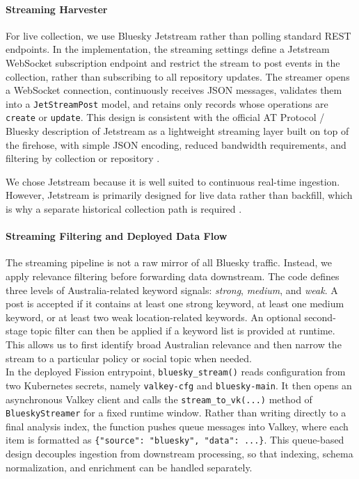 \paragraph{Streaming Harvester}
For live collection, we use Bluesky Jetstream rather than polling standard REST endpoints. In the implementation, the streaming settings define a Jetstream WebSocket subscription endpoint and restrict the stream to post events in the  collection, rather than subscribing to all repository updates. The streamer opens a WebSocket connection, continuously receives JSON messages, validates them into a \texttt{JetStreamPost} model, and retains only records whose operations are \texttt{create} or \texttt{update}. This design is consistent with the official AT Protocol / Bluesky description of Jetstream as a lightweight streaming layer built on top of the firehose, with simple JSON encoding, reduced bandwidth requirements, and filtering by collection or repository \cite{atproto2024jetstream,atproto2026streaming}.

We chose Jetstream because it is well suited to continuous real-time ingestion. However, Jetstream is primarily designed for live data rather than backfill, which is why a separate historical collection path is required \cite{atproto2024jetstream,atproto2026streaming}.

\paragraph{Streaming Filtering and Deployed Data Flow}
The streaming pipeline is not a raw mirror of all Bluesky traffic. Instead, we apply relevance filtering before forwarding data downstream. The code defines three levels of Australia-related keyword signals: \textit{strong}, \textit{medium}, and \textit{weak}. A post is accepted if it contains at least one strong keyword, at least one medium keyword, or at least two weak location-related keywords. An optional second-stage topic filter can then be applied if a keyword list is provided at runtime. This allows us to first identify broad Australian relevance and then narrow the stream to a particular policy or social topic when needed.
\\

In the deployed Fission entrypoint, \texttt{bluesky\_stream()} reads configuration from two Kubernetes secrets, namely \texttt{valkey-cfg} and \texttt{bluesky-main}. It then opens an asynchronous Valkey client and calls the \texttt{stream\_to\_vk(...)} method of \texttt{BlueskyStreamer} for a fixed runtime window. Rather than writing directly to a final analysis index, the function pushes queue messages into Valkey, where each item is formatted as \verb|{"source": "bluesky", "data": ...}|. This queue-based design decouples ingestion from downstream processing, so that indexing, schema normalization, and enrichment can be handled separately.
\\

